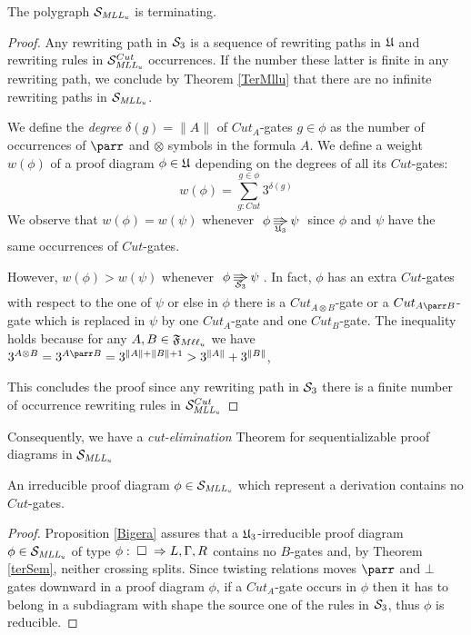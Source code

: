 \documentclass[a4paper]{article}
\begin{document}
\begin{theorem}\label{terSem}
The polygraph $\mathcal {S}_{{\mathit{MLL_u}}}$ is terminating.
\begin{proof}
Any rewriting path in $\mathcal {S}_{{3}}$ is a sequence of rewriting paths in $\mathfrak{U}$ and rewriting rules in $\mathcal {S}_{{\mathit{MLL_u}}}^{Cut}$ occurrences. If the number these latter is finite in any rewriting path, we conclude by Theorem \ref{TerMllu} that there are no infinite rewriting paths in $\mathcal {S}_{{\mathit{MLL_u}}}$.


We define the \emph{degree}  $\delta(g)=\|A\|$ of $Cut_A$-gates  $g\in\phi$ as the number of occurrences of $\parr$ and $\otimes$ symbols in the formula $A$. We define a weight $w(\phi)$ of a proof diagram $\phi\in \mathfrak{U}$ depending on the degrees of all its $Cut$-gates:
 $$w(\phi)=\sum^{g\in \phi}_{ g:Cut} 3^{\delta(g)}$$ 
We observe that $w(\phi)=w(\psi)$ whenever $\xymatrix@C=1em{\phi \ar@3[r]_{\Mllc_3} &\psi }$ since $\phi$ and $\psi$ have the same occurrences of $Cut$-gates. 

However, $w(\phi)>w(\psi)$  whenever $\xymatrix@C=1em{ \phi \ar@3[r]_{\Sem 3} &\psi} $. In fact, $\phi $ has an extra $Cut $-gates with respect to the one of $\psi$ or else in $\phi$ there is a $Cut_{A\otimes B}$-gate or a $Cut_{A\parr B}$-gate which is  replaced in $\psi$ by one $Cut_{A}$-gate and one $Cut_B$-gate. The inequality holds because for any $A,B\in {\mathfrak{F}_{M\ell \ell _u}}$ we have $3^{A\otimes B}=3^{A\parr B}=3^{\|A\|+\|B\|+1}> 3^{\|A\|}+3^{\|B\|}$, 

This concludes the proof since any rewriting path in $\mathcal {S}_{{3}}$ there is a finite number of occurrence rewriting rules in $\mathcal {S}_{{\mathit{MLL_u}}}^{Cut}$ 



\end{proof}
\end{theorem}


Consequently, we have a \emph{cut-elimination} Theorem for sequentializable proof diagrams in $\mathcal {S}_{{\mathit{MLL_u}}}$

\begin{theorem}
An irreducible proof diagram $\phi\in \mathcal {S}_{{\mathit{MLL_u}}}$ which represent a derivation contains no $Cut$-gates.
\begin{proof}
Proposition \ref{Bigera} assures that a $\mathfrak{U}_3$-irreducible proof diagram $\phi\in \mathcal {S}_{{\mathit{MLL_u}}}$ of type $\phi:\; \square \; \Rightarrow L,\Gamma,R$ contains no $B$-gates and, by  Theorem \ref{terSem}, neither crossing splits. Since twisting relations moves $\parr$ and $\bot$ gates downward in a proof diagram $\phi$, if a $Cut_A$-gate  occurs in $\phi$ then it  has to belong in a subdiagram with shape the source one of the rules in $\mathcal {S}_{{3}}$, thus $\phi$ is reducible.
\end{proof}
\end{theorem}
\end{document}
